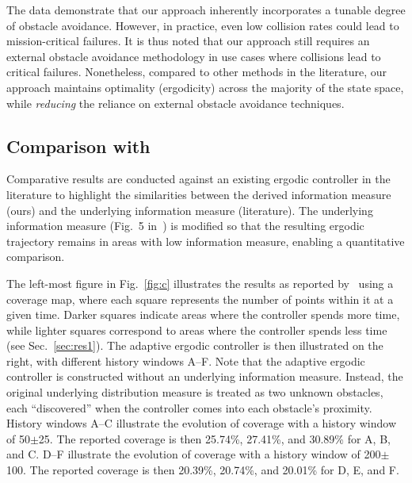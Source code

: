\documentclass[letterpaper, 10 pt, conference, twoside]{IEEEtran}
\theoremstyle{definition}
\begin{document}
The data demonstrate that our approach inherently incorporates a tunable degree of obstacle avoidance. However, in practice, even low collision rates could lead to mission-critical failures. It is thus noted that our approach still requires an external obstacle avoidance methodology in use cases where collisions lead to critical failures. 
Nonetheless, compared to other methods in the literature, our approach maintains optimality (ergodicity) across the majority of the state space, while \textit{reducing} the reliance on external obstacle avoidance techniques.

\subsection{Comparison with~\cite{calinon2020mixture}}\label{sec:res4}
\noindent
Comparative results are conducted against an existing ergodic controller in the literature to highlight the similarities between the derived information measure (ours) and the underlying information measure (literature). The underlying information measure (Fig.~5 in~\cite{calinon2020mixture}) is modified so that the resulting ergodic trajectory remains in areas with low information measure, enabling a quantitative comparison.

The left-most figure in Fig.~\ref{fig:c} illustrates the results as reported by~\cite{calinon2020mixture} using a coverage map, where each square represents the number of points within it at a given time. Darker squares indicate areas where the controller spends more time, while lighter squares correspond to areas where the controller spends less time (see Sec.~\ref{sec:res1}). The adaptive ergodic controller is then illustrated on the right, with different history windows A--F. Note that the adaptive ergodic controller is constructed without an underlying information measure. Instead, the original underlying distribution measure is treated as two unknown obstacles, each ``discovered'' when the controller comes into each obstacle's proximity. History windows A--C illustrate the evolution of coverage with a history window of 50$\pm$25. The reported coverage is then 25.74\%, 27.41\%, and 30.89\% for A, B, and C. D--F illustrate the evolution of coverage with a history window of 200$\pm$100. The reported coverage is then 20.39\%, 20.74\%, and 20.01\% for D, E, and F. %
\end{document}
